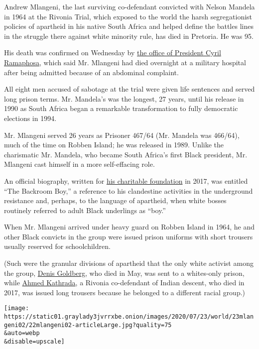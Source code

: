 Andrew Mlangeni, the last surviving co-defendant convicted with Nelson
Mandela in 1964 at the Rivonia Trial, which exposed to the world the
harsh segregationist policies of apartheid in his native South Africa
and helped define the battles lines in the struggle there against white
minority rule, has died in Pretoria. He was 95.

His death was confirmed on Wednesday by
\href{http://www.thepresidency.gov.za/press-statements/president-saddened-passing-struggle-hero-andrew-mekete-mlangeni}{the
office of President Cyril Ramaphosa}, which said Mr. Mlangeni had died
overnight at a military hospital after being admitted because of an
abdominal complaint.

All eight men accused of sabotage at the trial were given life sentences
and served long prison terms. Mr. Mandela's was the longest, 27 years,
until his release in 1990 as South Africa began a remarkable
transformation to fully democratic elections in 1994.

Mr. Mlangeni served 26 years as Prisoner 467/64 (Mr. Mandela was
466/64), much of the time on Robben Island; he was released in 1989.
Unlike the charismatic Mr. Mandela, who became South Africa's first
Black president, Mr. Mlangeni cast himself in a more self-effacing role.

An official biography, written for
\href{https://mlangenifoundation.org}{his charitable foundation} in
2017, was entitled ``The Backroom Boy,'' a reference to his clandestine
activities in the underground resistance and, perhaps, to the language
of apartheid, when white bosses routinely referred to adult Black
underlings as ``boy.''

When Mr. Mlangeni arrived under heavy guard on Robben Island in 1964, he
and other Black convicts in the group were issued prison uniforms with
short trousers usually reserved for schoolchildren.

(Such were the granular divisions of apartheid that the only white
activist among the group,
\href{https://www.nytimes3xbfgragh.onion/2020/05/08/world/africa/denis-goldberg-dead.html}{Denis
Goldberg}, who died in May, was sent to a whites-only prison, while
\href{https://www.nytimes3xbfgragh.onion/2017/03/28/world/africa/ahmed-kathrada-dies-nelson-mandela.html}{Ahmed
Kathrada}, a Rivonia co-defendant of Indian descent, who died in 2017,
was issued long trousers because he belonged to a different racial
group.)

\texttt{[image: https://static01.graylady3jvrrxbe.onion/images/2020/07/23/world/23mlangeni02/22mlangeni02-articleLarge.jpg?quality=75\\\&auto=webp\\\&disable=upscale]}


